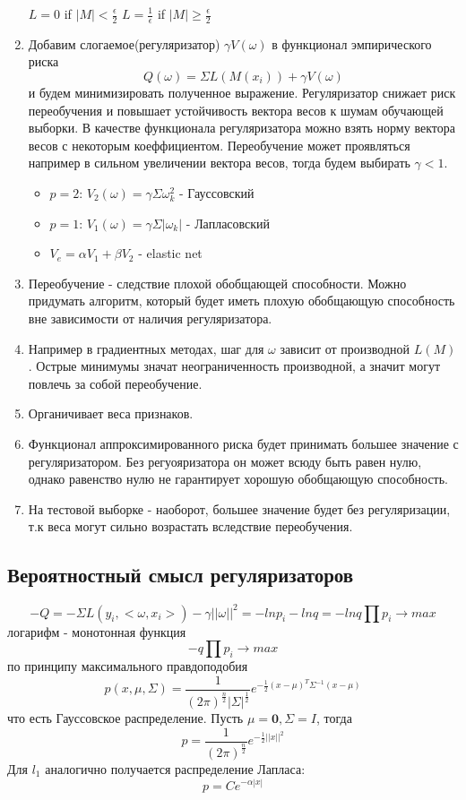 \documentclass[12pt]{article}
\begin{document}
\begin{enumerate}
$ L = 0$ if $|M|< \frac{\epsilon}{2}$  $ L= \frac{1}{\epsilon}$ if $|M| \geq \frac{\epsilon}{2} $
\item Добавим слогаемое(регуляризатор) $\gamma V(\omega)$ в функционал эмпирического риска
$$ Q(\omega) = \Sigma L(M(x_i)) + \gamma V(\omega)$$
и будем минимизировать полученное выражение. Регуляризатор снижает риск переобучения и повышает устойчивость вектора весов к шумам обучающей выборки. В качестве функционала регуляризатора можно взять норму вектора весов с некоторым коеффициентом. Переобучение может проявляться например в сильном увеличении вектора весов, тогда будем выбирать $\gamma < 1$.
\begin{itemize}
\item $p=2$: $V_2(\omega)=\gamma\Sigma\omega^2_k$ - Гауссовский
\item $p=1$: $V_1(\omega)=\gamma\Sigma |\omega_k|$ - Лапласовский
\item $V_e = \alpha V_1 + \beta V_2$ - elastic net
\end{itemize}
\item Переобучение - следствие плохой обобщающей способности. Можно придумать алгоритм, который будет иметь плохую обобщающую способность вне зависимости от наличия регуляризатора.
\item Например в градиентных методах, шаг для $\omega$ зависит от производной $L(M)$. Острые минимумы значат неограниченность производной, а значит могут повлечь за собой переобучение.
\item Органичивает веса признаков.
\item Функционал аппроксимированного риска будет принимать большее значение с регуляризатором. Без регуояризатора он может всюду быть равен нулю, однако равенство нулю не гарантирует хорошую обобщающую способность.
\item На тестовой выборке - наоборот, большее значение будет без регуляризации, т.к веса могут сильно возрастать вследствие переобучения.
\end{enumerate}
\subsection{Вероятностный смысл регуляризаторов}
$$-Q = -\Sigma L(y_i,<\omega ,x_i>) - \gamma ||\omega||^2 = -lnp_i -lnq = -lnq\prod p_i \rightarrow max$$
логарифм - монотонная функция
$$-q\prod p_i \rightarrow max$$
по принципу максимального правдоподобия
$$p(x,\mu, \Sigma)= \frac{1}{(2\pi)^{\frac{n}{2}}|\Sigma|^{\frac{1}{2}}}
e^{-\frac{1}{2}(x-\mu)^T\Sigma^{-1}(x-\mu)}$$
что есть Гауссовское распределение. Пусть $\mu = \textbf{0}, \Sigma = I$, тогда
$$p= \frac{1}{(2\pi)^{\frac{n}{2}}}e^{-\frac{1}{2}||x||^2}$$
Для $l_1$ аналогично получается распределение Лапласа:
$$p=Ce^{-\alpha |x|}$$
\end{document}
